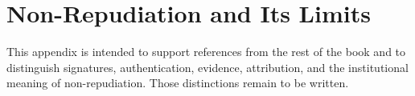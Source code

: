\chapter{Non-Repudiation and Its Limits}
\label{app:non-repudiation}


This appendix is intended to support references from the rest of the book and
to distinguish signatures, authentication, evidence, attribution, and the
institutional meaning of non-repudiation. Those distinctions remain to be
written.
